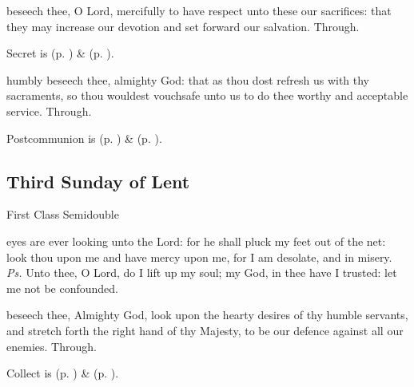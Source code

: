 \secret
{} beseech thee, O Lord, mercifully to have respect unto these our sacrifices: that they may increase our devotion and set forward our salvation. Through.
\begin{rubric}
     Secret is  (p. \pageref{SPSaints}) \&   (p. \pageref{SPLivingDeparted}).
\end{rubric}

\postcommunion
{} humbly beseech thee, almighty God: that as thou dost refresh us with thy sacraments, so thou wouldest vouchsafe unto us to do thee worthy and acceptable service. Through.
\begin{rubric}
     Postcommunion is  (p. \pageref{SPSaints}) \&   (p. \pageref{SPLivingDeparted}).
\end{rubric}


\clearpage
\subsection{Third Sunday of Lent}
\begin{inhead}
{First Class Semidouble}
\end{inhead}


\introit
{} eyes are ever looking unto the Lord: for he shall pluck my feet out of the net: look thou upon me and have mercy upon me, for I am desolate, and in misery. \textit{Ps.} Unto thee, O Lord, do I lift up my soul; my God, in thee have I trusted: let me not be confounded.

\collect
{} beseech thee, Almighty God, look upon the hearty desires of thy humble servants, and stretch forth the right hand of thy Majesty, to be our defence against all our enemies. Through.
\begin{rubric}
     Collect is  (p. \pageref{SPSaints}) \&   (p. \pageref{SPLivingDeparted}).
\end{rubric}

